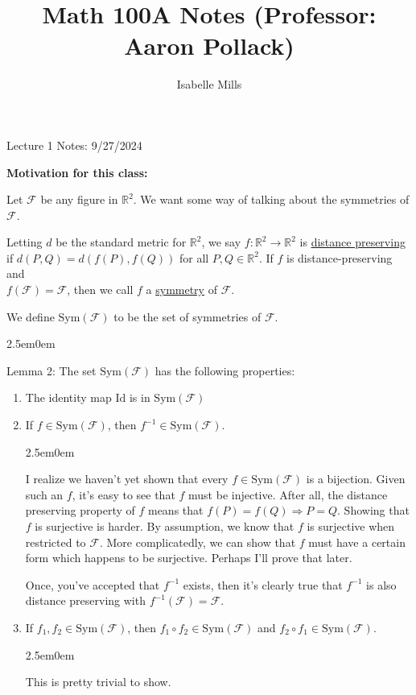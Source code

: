 \documentclass{book}
\title{Math 100A Notes (Professor: Aaron Pollack)}
\author{Isabelle Mills}
\newcommand{\hOne}{%
   \color{Black}%
   \fontsize{14}{16}\selectfont%
}
\newcommand{\hTwo}{%
\color{MidnightBlue}%
   \fontsize{13}{15}\selectfont%
}
\newcommand{\hThree}{%
   \color{PineGreen!85!Orange}
   \fontsize{12}{14}\selectfont%
}
\newenvironment{myIndent}{%
   \begin{adjustwidth}{2.5em}{0em}%
}{%
   \end{adjustwidth}%
}
\newcommand{\udefine}[1]{{%
   \setulcolor{Red}%
   \setul{0.14em}{0.07em}%
   \ul{#1}%
}}
\newcommand{\blab}[1]{\textbf{#1}}
\newcommand{\Sym}{\mathrm{Sym}}
\newcommand{\myId}{\mathrm{Id}}
\newcommand{\retTwo}{\hfill\bigbreak}
\newcommand{\mHeader}[1]{{
   \color{Black}%
   \fontsize{20}{18}\selectfont%
   #1\retTwo
}}
\begin{document}
\maketitle{}
\setul{0.14em}{0.07em}
\calibri

\hOne
\mHeader{Lecture 1 Notes: 9/27/2024}

\blab{Motivation for this class:}

Let $\mathcal{F}$ be any figure in $\mathbb{R}^2$. We want some way of talking about the symmetries of $\mathcal{F}$.\retTwo

Letting $d$ be the standard metric for $\mathbb{R}^2$, we say $f: \mathbb{R}^2 \longrightarrow \mathbb{R}^2$ is \udefine{distance preserving}\\ if $d(P, Q) = d(f(P), f(Q))$ for all $P, Q \in \mathbb{R}^2$. If $f$ is distance-preserving and\\ $f(\mathcal{F}) = \mathcal{F}$, then we call $f$ a \udefine{symmetry} of $\mathcal{F}$.\retTwo

We define $\Sym(\mathcal{F})$ to be the set of symmetries of $\mathcal{F}$.
\begin{myIndent}\hTwo
	Lemma 2: The set $\Sym(\mathcal{F})$ has the following properties:
	
	\begin{enumerate}
		\item The identity map $\myId$ is in $\Sym(\mathcal{F})$
		\item If $f \in \Sym(\mathcal{F})$, then $f^{-1} \in \Sym(\mathcal{F})$.
		\begin{myIndent}\hThree
			I realize we haven't yet shown that every $f \in \Sym(\mathcal{F})$ is a bijection. Given such an $f$, it's easy to see that $f$ must be injective. After all, the distance\\ preserving property of $f$ means that $f(P) = f(Q) \Longrightarrow P = Q$. Showing that $f$ is surjective is harder. By assumption, we know that $f$ is surjective when restricted to $\mathcal{F}$. More complicatedly, we can show that $f$ must have a certain form which happens to be surjective. Perhaps I'll prove that later.\retTwo

			Once, you've accepted that $f^{-1}$ exists, then it's clearly true that $f^{-1}$ is also distance preserving with $f^{-1}(\mathcal{F}) = \mathcal{F}$.
		\end{myIndent}
		\item If $f_1, f_2 \in \Sym(\mathcal{F})$, then $f_1 \circ f_2 \in \Sym(\mathcal{F})$ and $f_2 \circ f_1 \in \Sym(\mathcal{F})$.
		\begin{myIndent}\hThree
			This is pretty trivial to show.\retTwo
		\end{myIndent}
	\end{enumerate}
\end{myIndent}
\end{document}

